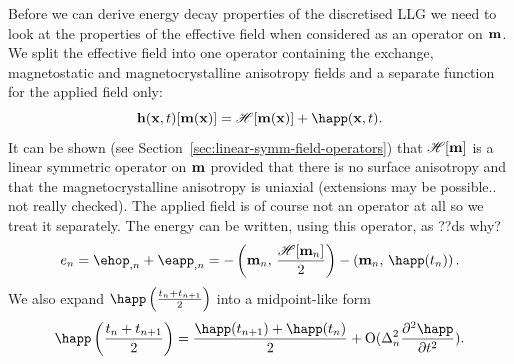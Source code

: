 Before we can derive energy decay properties of the discretised LLG we need to look at the properties of the effective field when considered as an operator on $\mathbf{m}$.
We split the effective field into one operator containing the exchange, magnetostatic and magnetocrystalline anisotropy fields and a separate function for the applied field only:
\begin{equation}
  \label{eq:hop}
  \hv(\xv, t)[\mv(\xv)] = \hop [\mv(\xv)] + \happ(\xv, t).
\end{equation}
It can be shown (see Section~\ref{sec:linear-symm-field-operators}) that $\mathscr{H}[\mathbf{m}]$ is a linear symmetric operator on $\mathbf{m}$ provided that there is no surface anisotropy and that the magnetocrystalline anisotropy is uniaxial (extensions may be possible.. not really checked).
The applied field is of course not an operator at all so we treat it separately. The energy can be written, using this operator, as ??ds why?
\begin{equation}
  \label{eq:energy-hop}
  \e_n = \ehop_{,n} + \eapp_{,n} = - \ip{\mv_n}{\frac{\hop[\mv_n]}{2}} - \ip{\mv_n}{\happ(t_n)}.
\end{equation}
We also expand $\mphapp$ into a midpoint-like form
\begin{equation}
  \mphapp = \frac{\happ(t_{n+1}) + \happ(t_n)}{2} + \order{\dtn^2 \spd{\happ}{t}}.
  \label{eq:happ-midpoint}
\end{equation}


